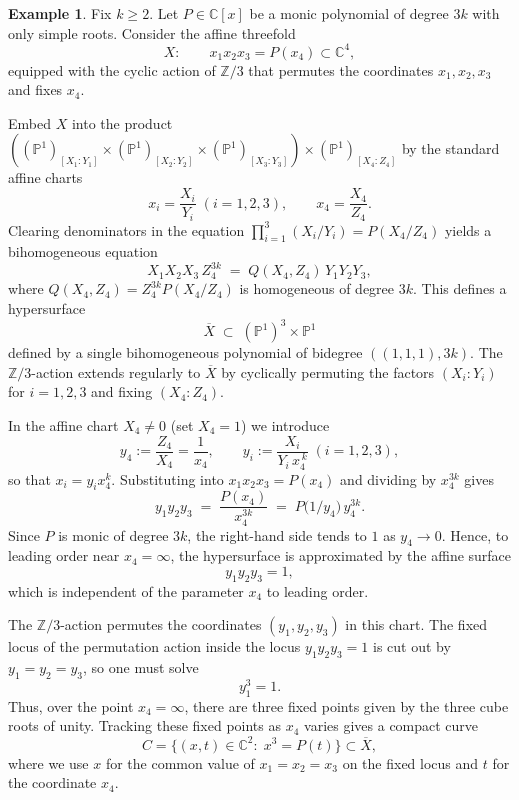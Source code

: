 \documentclass[12pt,a4paper]{amsart}
\theoremstyle{definition}
\newtheorem{example}[theorem]{Example}
\theoremstyle{remark}
\begin{document}
\begin{example}\label{ex:fixed-higher-genus-curve}
Fix $k\ge 2$. Let $P\in\mathbb{C}[x]$ be a monic polynomial of degree $3k$ with only simple roots. Consider the affine threefold
\[
X:\qquad x_1x_2x_3 = P(x_4)\subset \mathbb{C}^4,
\]
equipped with the cyclic action of $\mathbb{Z}/3$ that permutes the coordinates $x_1,x_2,x_3$ and fixes $x_4$. 

Embed $X$ into the product $((\mathbb{P}^1)_{[X_1:Y_1]}\times(\mathbb{P}^1)_{[X_2:Y_2]}\times(\mathbb{P}^1)_{[X_3:Y_3]})\times(\mathbb{P}^1)_{[X_4:Z_4]}$ by the standard affine charts
\[
x_i=\frac{X_i}{Y_i}\;(i=1,2,3),\qquad x_4=\frac{X_4}{Z_4}.
\]
Clearing denominators in the equation $\prod_{i=1}^3(X_i/Y_i)=P(X_4/Z_4)$ yields a bihomogeneous equation
\[
X_1X_2X_3\,Z_4^{3k} \;=\; Q(X_4, Z_4)\,Y_1Y_2Y_3,
\]
where $Q(X_4, Z_4) = Z_4^{3k}P(X_4/Z_4)$ is homogeneous of degree $3k$. This defines a hypersurface
\[
\overline X\;\subset\; (\mathbb{P}^1)^3\times\mathbb{P}^1
\]
defined by a single bihomogeneous polynomial of bidegree $((1,1,1),3k)$. The $\mathbb{Z}/3$-action extends regularly to $\overline X$ by cyclically permuting the factors $(X_i:Y_i)$ for $i=1,2,3$ and fixing $(X_4:Z_4)$.

In the affine chart $X_4\neq0$ (set $X_4=1$) we introduce
\[
y_4:=\frac{Z_4}{X_4}=\frac{1}{x_4},\qquad y_i:=\frac{X_i}{Y_i\,x_4^{\,k}}\;(i=1,2,3),
\]
so that $x_i=y_i x_4^{k}$. Substituting into $x_1x_2x_3=P(x_4)$ and dividing by $x_4^{3k}$ gives 
\begin{equation}\label{eq:chart-infty}
 y_1y_2y_3 \;=\; \frac{P(x_4)}{x_4^{3k}} \;=\; P\bigl(1/y_4\bigr)\,y_4^{3k}.
\end{equation}
Since $P$ is monic of degree $3k$, the right-hand side tends to $1$ as $y_4\to0$. Hence, to leading order near $x_4=\infty$, the hypersurface is approximated by the affine surface
\[
y_1y_2y_3=1,
\]
which is independent of the parameter $x_4$ to leading order.

The $\mathbb{Z}/3$-action permutes the coordinates $(y_1,y_2,y_3)$ in this chart. The fixed locus of the permutation action inside the locus $y_1y_2y_3=1$ is cut out by $y_1=y_2=y_3$, so one must solve
\[
y_1^3 = 1.
\]
Thus, over the point $x_4=\infty$, there are three fixed points given by the three cube roots of unity. Tracking these fixed points as $x_4$ varies gives a compact curve
\[
C=\{(x,t)\in\mathbb{C}^2:\; x^3 = P(t)\}\subset\overline X,
\]
where we use $x$ for the common value of $x_1=x_2=x_3$ on the fixed locus and $t$ for the coordinate $x_4$.


\end{example}
\end{document}
